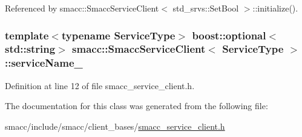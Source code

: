 Referenced by smacc\+::\+Smacc\+Service\+Client$<$ std\+\_\+srvs\+::\+Set\+Bool $>$\+::initialize().

\subsubsection[{\texorpdfstring{service\+Name\+\_\+}{serviceName_}}]{\setlength{\rightskip}{0pt plus 5cm}template$<$typename Service\+Type$>$ boost\+::optional$<$std\+::string$>$ {\bf smacc\+::\+Smacc\+Service\+Client}$<$ Service\+Type $>$\+::service\+Name\+\_\+}\hypertarget{classsmacc_1_1SmaccServiceClient_a93cf1653e9d7a0f4aa25dbb8ae7d07fc}{}\label{classsmacc_1_1SmaccServiceClient_a93cf1653e9d7a0f4aa25dbb8ae7d07fc}


Definition at line 12 of file smacc\+\_\+service\+\_\+client.\+h.



The documentation for this class was generated from the following file\+:\begin{DoxyCompactItemize}
\item 
smacc/include/smacc/client\+\_\+bases/\hyperlink{smacc__service__client_8h}{smacc\+\_\+service\+\_\+client.\+h}\end{DoxyCompactItemize}
